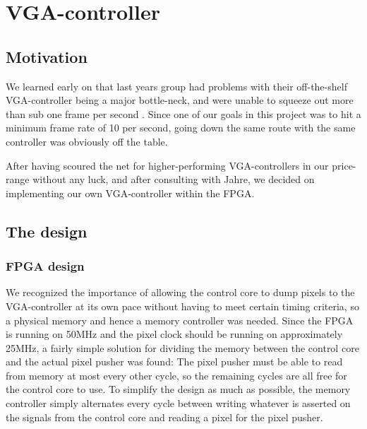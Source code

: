 \section{VGA-controller}


\subsection{Motivation}
 We learned early on that last years
group had problems with their off-the-shelf VGA-controller being a major
bottle-neck, and were unable to squeeze out more than sub one frame per second
. Since one of our goals  in this project was
to hit a minimum frame rate of 10 per second, going down the same route with the
same controller was obviously off the table.

After having scoured the net for higher-performing VGA-controllers in our
price-range without any luck, and after consulting with Jahre, we decided on
implementing our own VGA-controller within the FPGA.

\subsection{The design}
\subsubsection{FPGA design}

We recognized the importance of allowing the control core to dump pixels to the
VGA-controller at its own pace without having to meet certain timing criteria,
so a physical memory and hence a memory controller was needed.  Since the FPGA
is running on 50MHz and the pixel clock should be running on approximately
25MHz, a fairly simple solution for dividing the memory between the control core
and the actual pixel pusher was found: The pixel
pusher must be able to read from memory at most every other cycle, so the
remaining cycles are all free for the control core to use.  To simplify the
design as much as possible, the memory controller simply alternates every cycle
between writing whatever is asserted on the signals from the control core and
reading a pixel for the pixel pusher.

